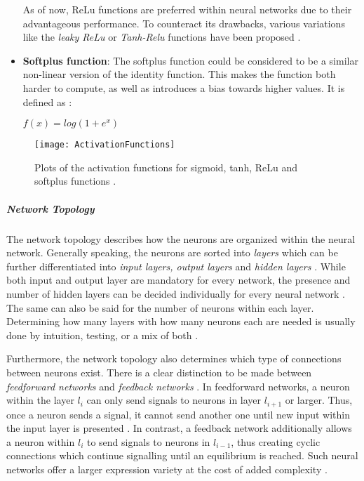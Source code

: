 \documentclass[draft,final]{vutinfth} %
\begin{document}
\begin{itemize}
As of now, ReLu functions are preferred within neural networks due to their advantageous performance. To counteract its drawbacks, various variations like the \emph{leaky ReLu} or \emph{Tanh-Relu} functions have been proposed \cite{bai2022relu}.

\item \textbf{Softplus function}: The softplus function could be considered to be a similar non-linear version of the identity function. This makes the function both harder to compute, as well as introduces a bias towards higher values. It is defined as \cite{zheng2015improving}:
\begin{center}
$f(x)=log(1+e^x)$
\end{center} 

\end{itemize}
\begin{figure}
\begin{center}
\texttt{[image: ActivationFunctions]}
\end{center}
\caption{Plots of the activation functions for sigmoid, tanh, ReLu and softplus functions \cite{wang2020influence}.}
\end{figure}
\subparagraph{Network Topology} The network topology describes how the neurons are organized within the neural network. Generally speaking, the neurons are sorted into \emph{layers} which can be further differentiated into \emph{input layers, output layers} and \emph{hidden layers} \cite{ibnu2019determining}. While both input and output layer are mandatory for every network, the presence and number of hidden layers can be decided individually for every neural network \cite{ibnu2019determining}. The same can also be said for the number of neurons within each layer. Determining how many layers with how many neurons each are needed is usually done by intuition, testing, or a mix of both \cite{zou2009overview}.

Furthermore, the network topology also  determines which type of connections between neurons exist. There is a clear distinction to be made between \emph{feedforward networks} and \emph{feedback networks} \cite{zou2009overview}. In feedforward networks, a neuron within the layer $l_i$ can only send signals to neurons in layer $l_{i+1}$ or larger. Thus, once a neuron sends a signal, it cannot send another one until new input within the input layer is presented \cite{razavi2011new}.
In contrast, a feedback network additionally allows a neuron within $l_i$ to send signals to neurons in $l_{i-1}$, thus creating cyclic connections which continue signalling until an equilibrium is reached. Such neural networks offer a larger expression variety at the cost of added complexity \cite{salehinejad2017recent}.
\end{document}
